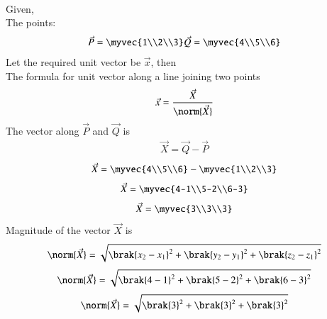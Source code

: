 \documentclass[journal]{IEEEtran}
\begin{document}
         \solution \\
         Given,\\
         The points: 
         \begin{align}
             \vec{P}=\myvec{1\\2\\3} \vec{Q}=\myvec{4\\5\\6}
         \end{align}
         Let the required unit vector be $\vec{x}$, then\\ 
         The formula for unit vector along a line joining two points
         \begin{align}
             \vec{{x}}=\frac{\vec{X}}{\norm{\vec{X}}}
         \end{align}
         The vector along $\vec{P}$ and $\vec{Q}$ is\\
         \begin{align}
             \vec{X}=\vec{Q}-\vec{P}
         \end{align}
         \begin{align}
             \vec{X}=\myvec{4\\5\\6}-\myvec{1\\2\\3}
         \end{align}
         \begin{align}
             \vec{X}=\myvec{4-1\\5-2\\6-3}
         \end{align}
         \begin{align}
             \vec{X}=\myvec{3\\3\\3}
         \end{align}
         Magnitude of the vector $\vec{X}$ is\\
         \begin{align}
             \norm{\vec{X}}=\sqrt{\brak{x_2-x_1}^2+\brak{y_2-y_1}^2+\brak{z_2-z_1}^2}
         \end{align}
         \begin{align}
             \norm{\vec{X}}=\sqrt{\brak{4-1}^2+\brak{5-2}^2+\brak{6-3}^2}
         \end{align}
         \begin{align}
             \norm{\vec{X}}=\sqrt{\brak{3}^2+\brak{3}^2+\brak{3}^2}
         \end{align}
\end{document}
